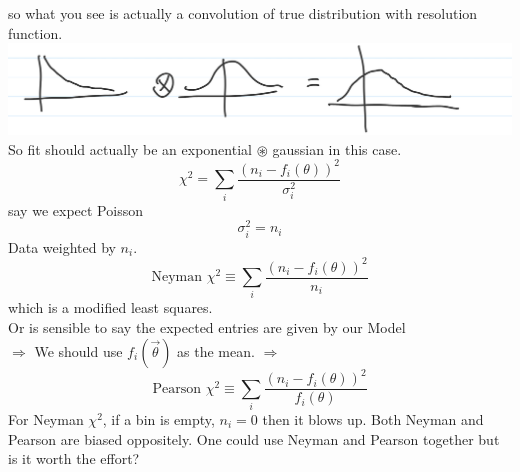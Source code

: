 \begin{itemize}
\begin{enumerate}
                    so what you see is actually a convolution of true distribution with resolution function.\\
                    \includegraphics[width = 0.4 \linewidth]{Images/lec11-convolution.png}\\
                    So fit should actually be an exponential $\circledast$ gaussian in this case.\\
                    \[ \chi^2 = \sum_i \frac{(n_i - f_i(\theta))^2}{\sigma_{i}^2} \]
                    say we expect Poisson
                    \[ \sigma_i^2 = n_i \]
                    Data weighted by $n_i$.
                    \[ \text{Neyman } \chi^2 \equiv \sum_i \frac{(n_i - f_i(\theta))^2}{n_i} \]
                    which is a modified least squares. \\
                    Or is sensible to say the expected entries are given by our Model\\
                    $\Rightarrow$ We should use $f_i(\vec{\theta})$ as the mean.
                    $\Rightarrow$
                    \[ \text{Pearson } \chi^2 \equiv \sum_i \frac{(n_i - f_i(\theta))^2}{f_i(\theta)} \]
                    For Neyman $\chi^2$, if a bin is empty, $n_i = 0$ then it blows up. Both Neyman and Pearson are biased oppositely. One could use Neyman and Pearson together but is it worth the effort?
          \end{enumerate}
\end{itemize}

